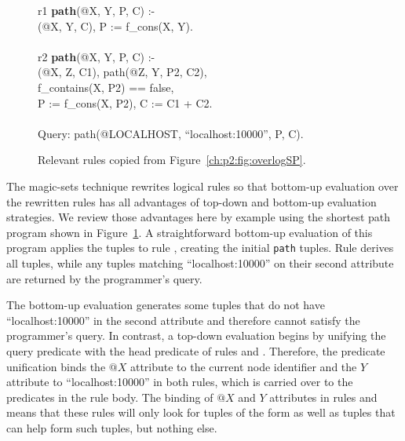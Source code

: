 \begin{figure}[!t]
\ssp
\centering
\begin{boxedminipage}{\linewidth}
r1 {\bf path}(@X, Y, P, C) :- \\
(@X, Y, C), P := f\_cons(X, Y). \\
\\
r2 {\bf path}(@X, Y, P, C) :- \\
(@X, Z, C1), path(@Z, Y, P2, C2),\\
\datalogspace f\_contains(X, P2) == false, \\
\datalogspace P := f\_cons(X, P2), C := C1 + C2. \\
\\
Query: path(@LOCALHOST, ``localhost:10000'', P, C).
\end{boxedminipage}
\caption{\label{ch:magic:fig:basicSP}Relevant rules copied from Figure~\ref{ch:p2:fig:overlogSP}.}
\end{figure}

The magic-sets technique rewrites logical rules so that bottom-up evaluation
over the rewritten rules has all advantages of top-down and bottom-up
evaluation strategies.  We review those advantages here by example using the
shortest path program shown in Figure~\ref{ch:magic:fig:basicSP}.  A
straightforward bottom-up evaluation of this program applies the 
tuples to rule , creating the initial {\tt path} tuples.  Rule 
derives all  tuples, while any  tuples matching
``localhost:10000'' on their second attribute are returned by the programmer's
query.

The bottom-up evaluation generates some  tuples that do not have
``localhost:10000'' in the second attribute and therefore cannot satisfy the
programmer's query.  In contrast, a top-down evaluation begins by unifying the
query predicate with the head predicate of rules  and .
Therefore, the  predicate unification binds the $@X$ attribute to the
current node identifier and the $Y$ attribute to ``localhost:10000'' in both
rules, which is carried over to the predicates in the rule body.  The binding
of $@X$ and $Y$ attributes in rules  and  means that these rules
will only look for tuples of the form
 as well as tuples that can help
form such  tuples, but nothing else.

